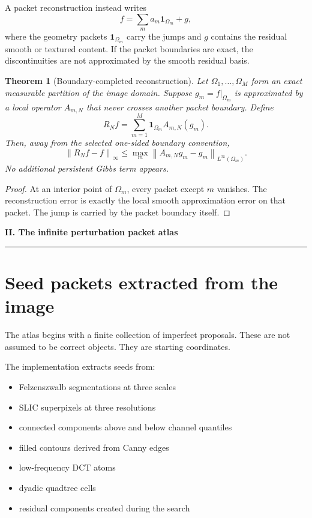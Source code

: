 \documentclass[11pt]{article}
\newtheorem{theorem}{Theorem}[section]
\theoremstyle{definition}
\theoremstyle{remark}
\newcommand{\norm}[1]{\left\lVert #1\right\rVert}
\newcommand{\InlinePart}[1]{%
  \Needspace{15\baselineskip}%
  \vspace{1.5em}%
  {\color{Blue}\LARGE\bfseries #1\par}%
  \vspace{0.55em}%
  {\color{Blue}\rule{\linewidth}{1.1pt}}\par%
  \vspace{0.75em}%
}
\begin{document}
A packet reconstruction instead writes
\[
f=\sum_{m} a_m\mathbf 1_{\Omega_m}+g,
\]
where the geometry packets $\mathbf 1_{\Omega_m}$ carry the jumps and $g$ contains the residual smooth or textured content. If the packet boundaries are exact, the discontinuities are not approximated by the smooth residual basis.

\begin{theorem}[Boundary-completed reconstruction]
Let $\Omega_1,\ldots,\Omega_M$ form an exact measurable partition of the image domain. Suppose $g_m=f|_{\Omega_m}$ is approximated by a local operator $A_{m,N}$ that never crosses another packet boundary. Define
\[
R_Nf=\sum_{m=1}^{M}\mathbf 1_{\Omega_m}A_{m,N}(g_m).
\]
Then, away from the selected one-sided boundary convention,
\[
\norm{R_Nf-f}_{\infty}
\le
\max_m\norm{A_{m,N}g_m-g_m}_{L^\infty(\Omega_m)}.
\]
No additional persistent Gibbs term appears.
\end{theorem}

\begin{proof}
At an interior point of $\Omega_m$, every packet except $m$ vanishes. The reconstruction error is exactly the local smooth approximation error on that packet. The jump is carried by the packet boundary itself.
\end{proof}

\InlinePart{II. The infinite perturbation packet atlas}

\section{Seed packets extracted from the image}
The atlas begins with a finite collection of imperfect proposals. These are not assumed to be correct objects. They are starting coordinates.

The implementation extracts seeds from:
\begin{itemize}
\item Felzenszwalb segmentations at three scales
\item SLIC superpixels at three resolutions
\item connected components above and below channel quantiles
\item filled contours derived from Canny edges
\item low-frequency DCT atoms
\item dyadic quadtree cells
\item residual components created during the search
\end{itemize}
\end{document}
